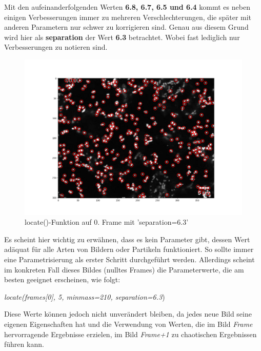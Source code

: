 \begin{enumerate}
Mit den aufeinanderfolgenden Werten \textbf{6.8, 6.7, 6.5 und 6.4} kommt es neben einigen Verbesserungen immer zu mehreren Verschlechterungen, die später mit anderen Parametern nur schwer zu korrigieren sind. 
Genau aus diesem Grund wird hier als  \textbf{separation} der Wert \textbf{6.3} betrachtet.
Wobei fast lediglich nur Verbesserungen zu notieren sind. 
\begin{figure}[H]
    \centering
    \includegraphics[scale=0.35]{Grafiken/trackpyBilder/locate_with_separation_(6,3).png}
    \caption{locate()-Funktion auf 0. Frame mit 'separation=6.3'}
    \label{fig:kap3_sep=6.3}
\end{figure}


\end{enumerate}


Es scheint hier wichtig zu erwähnen, dass es kein Parameter gibt, dessen Wert adäquat für alle Arten von Bildern oder Partikeln funktioniert. So sollte immer eine Parametrisierung als erster Schritt durchgeführt werden.
Allerdings scheint im konkreten Fall dieses Bildes (nulltes Frames) die Parameterwerte, die am besten geeignet erscheinen, wie folgt: \\
\begin{center}
{\large \textit{locate(frames[0], 5, minmass=210, separation=6.3})}
\end{center}

Diese Werte können jedoch nicht unverändert bleiben, da jedes neue Bild seine eigenen Eigenschaften hat und die Verwendung von Werten, die im Bild \textit{Frame} hervorragende Ergebnisse erzielen, im Bild \textit{Frame+1} zu chaotischen Ergebnissen führen kann.

